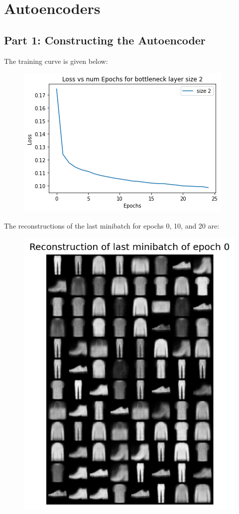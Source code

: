 \section{Autoencoders}

\subsection{Part 1: Constructing the Autoencoder} 
    
The training curve is given below:


 \begin{figure}[H]
   \centering
     \includegraphics[scale=0.8]{templates/ae_curve1}
 \end{figure}

The reconstructions of the last minibatch for epochs 0, 10, and 20 are:


 \begin{figure}[H]
   \centering
     \includegraphics[scale=0.8]{templates/re0}
 \end{figure}

